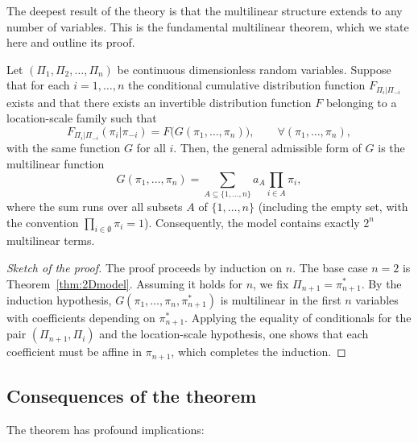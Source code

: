 The deepest result of the theory is that the multilinear structure extends to any number of variables. This is the fundamental multilinear theorem, which we state here and outline its proof.

\begin{theorem}
\label{thm:multilinear}
Let \((\Pi_1,\Pi_2,\ldots,\Pi_n)\) be continuous dimensionless random variables. Suppose that for each \(i=1,\ldots,n\) the conditional cumulative distribution function \(F_{\Pi_i|\Pi_{-i}}\) exists and that there exists an invertible distribution function \(F\) belonging to a location-scale family such that
\[
F_{\Pi_i|\Pi_{-i}}(\pi_i|\pi_{-i}) = F\bigl(G(\pi_1,\ldots,\pi_n)\bigr), \qquad \forall (\pi_1,\ldots,\pi_n),
\]
with the same function \(G\) for all \(i\). Then, the general admissible form of \(G\) is the multilinear function
\begin{equation}G(\pi_1,\ldots,\pi_n) = \sum_{A\subseteq\{1,\ldots,n\}} a_A \prod_{i\in A} \pi_i,
\label{eq:multilinear-general}
\end{equation}
where the sum runs over all subsets \(A\) of \(\{1,\ldots,n\}\) (including the empty set, with the convention \(\prod_{i\in\emptyset}\pi_i=1\)). Consequently, the model contains exactly \(2^n\) multilinear terms.
\end{theorem}

\begin{proof}[Sketch of the proof]
The proof proceeds by induction on \(n\). The base case \(n=2\) is Theorem~\ref{thm:2Dmodel}. Assuming it holds for \(n\), we fix \(\Pi_{n+1}=\pi_{n+1}^*\). By the induction hypothesis, \(G(\pi_1,\ldots,\pi_n,\pi_{n+1}^*)\) is multilinear in the first \(n\) variables with coefficients depending on \(\pi_{n+1}^*\). Applying the equality of conditionals for the pair \((\Pi_{n+1},\Pi_i)\) and the location-scale hypothesis, one shows that each coefficient must be affine in \(\pi_{n+1}\), which completes the induction.
\end{proof}

\subsection{Consequences of the theorem}

The theorem has profound implications:

